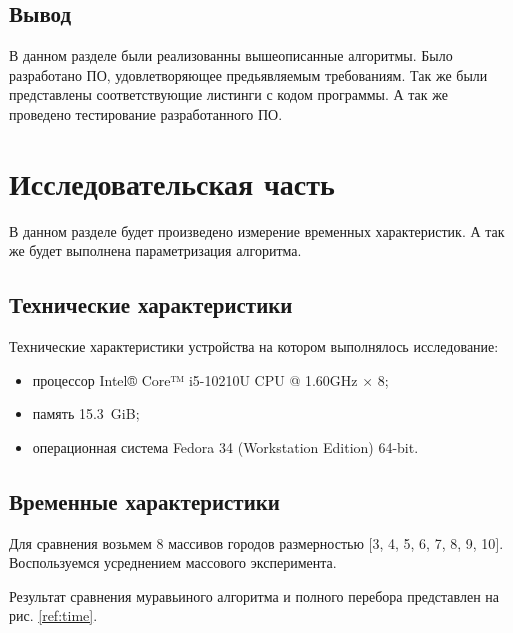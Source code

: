 \documentclass[12pt,a4paper]{report}
\begin{document}
\section*{Вывод}

В данном разделе были реализованны вышеописанные алгоритмы. Было разработано ПО, удовлетворяющее предьявляемым требованиям. Так же были представлены соответствующие листинги с кодом программы. А так же проведено тестирование разработанного ПО.

\newpage
\chapter{Исследовательская часть} 



В данном разделе будет произведено измерение временных характеристик.
А так же будет выполнена параметризация алгоритма.

\section{Технические характеристики}


Технические характеристики устройства на котором выполнялось исследование:
\begin{itemize}
	\item процессор Intel® Core™ i5-10210U CPU @ 1.60GHz × 8;
	\item память 15.3 GiB;
	\item операционная система Fedora 34 (Workstation Edition) 64-bit.
\end{itemize}

\section{Временные характеристики}

Для сравнения возьмем 8 массивов городов размерностью
$[$3, 4, 5, 6, 7, 8, 9, 10$]$.
Воспользуемся усреднением массового эксперимента.

Результат сравнения муравьиного алгоритма и полного перебора представлен на рис. \ref{ref:time}.

\begin{figure}[ht!]
\end{figure}
\end{document}
